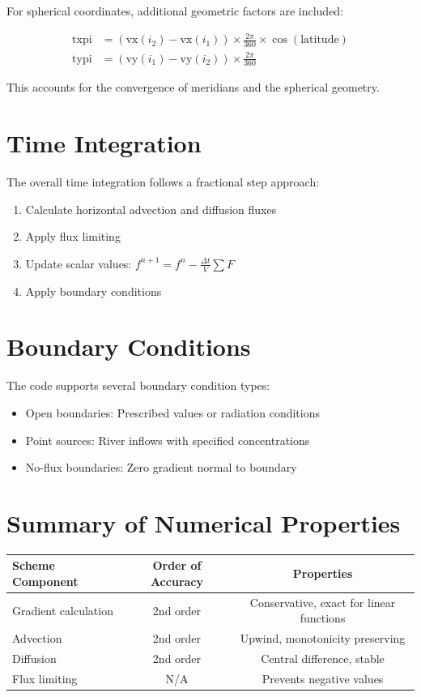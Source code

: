 \documentclass[11pt,a4paper]{article}
\begin{document}
For spherical coordinates, additional geometric factors are included:

\begin{align}
\text{txpi} &= (\text{vx}(i_2) - \text{vx}(i_1)) \times \frac{2\pi}{360} \times \cos(\text{latitude}) \\
\text{typi} &= (\text{vy}(i_1) - \text{vy}(i_2)) \times \frac{2\pi}{360}
\end{align}

This accounts for the convergence of meridians and the spherical geometry.

\section{Time Integration}

The overall time integration follows a fractional step approach:
\begin{enumerate}
\item Calculate horizontal advection and diffusion fluxes
\item Apply flux limiting
\item Update scalar values: $f^{n+1} = f^n - \frac{\Delta t}{V} \sum F$
\item Apply boundary conditions
\end{enumerate}

\section{Boundary Conditions}

The code supports several boundary condition types:
\begin{itemize}
\item Open boundaries: Prescribed values or radiation conditions
\item Point sources: River inflows with specified concentrations
\item No-flux boundaries: Zero gradient normal to boundary
\end{itemize}

\section{Summary of Numerical Properties}

\begin{table}[h]
\centering
\begin{tabular}{@{}lcc@{}}
\toprule
\textbf{Scheme Component} & \textbf{Order of Accuracy} & \textbf{Properties} \\
\midrule
Gradient calculation & 2nd order & Conservative, exact for linear functions \\
Advection & 2nd order & Upwind, monotonicity preserving \\
Diffusion & 2nd order & Central difference, stable \\
Flux limiting & N/A & Prevents negative values \\
\bottomrule
\end{tabular}
\end{table}
\end{document}
